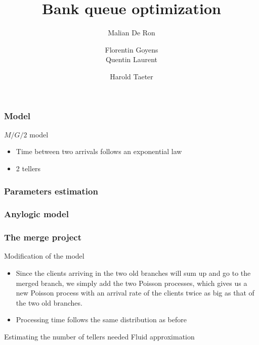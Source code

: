 \documentclass[10pt]{beamer}
\title{Bank queue optimization}
\author[Malian DR, Florentin G, Quentin L, Harlod T]{
  \small
  Malian De Ron
  \and
  Florentin Goyens
  \\
  Quentin Laurent
  \and
  Harold Taeter
}
\begin{document}
\begin{frame}
  \maketitle
\end{frame}

\begin{frame}
  \frametitle{Model}
  \begin{block}{$M/G/2$ model}
  \begin{itemize}
    \item Time between two arrivals follows an exponential law
    \item 2 tellers
    \end{itemize}
  \end{block}
\end{frame}


\begin{frame}
  \frametitle{Parameters estimation}
 
  
\end{frame}

\begin{frame}
  \frametitle{Anylogic model}
  
\end{frame}

\begin{frame}
  \frametitle{The merge project}
  \begin{block}{Modification of the model}
  \begin{itemize}
  \item  Since the clients arriving in the two old branches will sum up and go to the merged branch, we simply add the two Poisson processes, which gives us a new Poisson process with an arrival rate of the clients twice as big as that of the two old branches.
  \item Processing time follows the same distribution as before
  \end{itemize}
  \end{block}
  
  \begin{block}{Estimating the number of tellers needed}
  Fluid approximation
  \end{block}
\end{frame}
\end{document}
